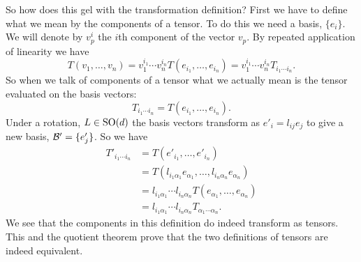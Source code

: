 So how does this gel with the transformation definition?
First we have to define what we mean by the components of a tensor.
To do this we need a basis, \(\{e_i\}\).
We will denote by \(v^{i}_p\) the \(i\)th component of the vector \(v_p\).
By repeated application of linearity we have
\[T(v_1, \dotsc, v_n) = v_1^{i_1}\dotsm v_n^{i_n}T(e_{i_1}, \dotsc, e_{i_n}) = v_1^{i_1}\dotsm v_n^{i_n}T_{i_1\dotsm i_n}.\]
So when we talk of components of a tensor what we actually mean is the tensor evaluated on the basis vectors:
\[T_{i_1\dotsm i_n} = T(e_{i_1}, \dotsc, e_{i_n}).\]
Under a rotation, \(L\in\mathrm{SO}(d)\) the basis vectors transform as \(e'_i = l_{ij}e_{j}\) to give a new basis, \(\mathcal{B}' = \{e'_j\}\).
So we have
\begin{align*}
    T'_{i_1\dotsm i_n} &= T(e'_{i_1}, \dotsc, e'_{i_n})\\
    &= T(l_{i_1\alpha_1}e_{\alpha_1}, \dotsc, l_{i_n\alpha_n}e_{\alpha_n})\\
    &= l_{i_1\alpha_1}\dotsm l_{i_n\alpha_n}T(e_{\alpha_1}, \dotsc, e_{\alpha_n})\\
    &= l_{i_1\alpha_1}\dotsm l_{i_n\alpha_n} T_{\alpha_1\dotsm\alpha_n}.
\end{align*}
We see that the components in this definition do indeed transform as tensors.
This and the quotient theorem prove that the two definitions of tensors are indeed equivalent.